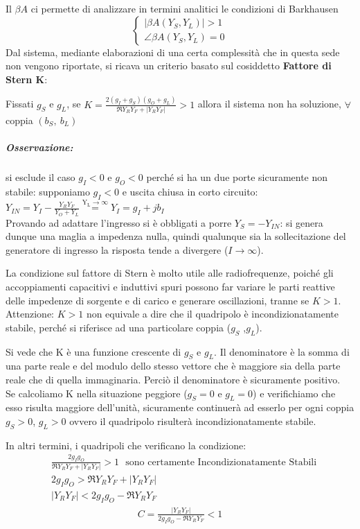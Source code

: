 Il $\beta A$ ci permette di analizzare in termini analitici le condizioni di Barkhausen
$$\begin{cases}
| \beta A (Y_S,Y_L) | > 1\\
\angle \beta A (Y_S,Y_L)  = 0
\end{cases}$$
Dal sistema, mediante elaborazioni di una certa complessità che in questa sede non vengono
riportate, si ricava un criterio basato sul cosiddetto \textbf{Fattore di Stern K}:

Fissati $g_S$ e $g_L$, se
$\displaystyle K = \frac{2(g_I+g_S)(g_O + g_L)}{\Re{Y_R Y_F}	+  |Y_R Y_F|} > 1$ allora il sistema non ha soluzione, $\forall$ coppia $(b_S,~b_L)$

\subparagraph{Osservazione:} si esclude il caso $g_I<0$ e $g_O<0$ perché si ha un due porte sicuramente non stabile:
supponiamo $g_I < 0$ e uscita chiusa in corto circuito: $Y_{IN} = Y_I - \frac{Y_R Y_F}{Y_O + Y_L} \overset{\mathrm{Y_L \rightarrow \infty}}{=} Y_I
= g_I + jb_I$
\\
Provando ad adattare l'ingresso si è obbligati a porre $Y_S = -Y_{IN}$: si genera dunque una maglia a impedenza nulla, quindi qualunque sia la sollecitazione del generatore di ingresso la risposta tende a divergere ($I \rightarrow \infty$).

La condizione sul fattore di Stern è molto utile alle radiofrequenze, poiché gli accoppiamenti capacitivi e induttivi spuri possono far variare le parti reattive delle impedenze di sorgente e di carico e generare oscillazioni, tranne se $K>1$.\\
Attenzione: $K>1$ non equivale a dire che il quadripolo è incondizionatamente stabile, perché si riferisce ad una particolare coppia ($g_S$ ,$g_L$).

Si vede che K è una funzione crescente di $g_S$ e $g_L$. Il denominatore è la somma di una parte reale e del modulo
dello stesso vettore che è maggiore sia della parte reale che di quella immaginaria. Perciò il
denominatore è sicuramente positivo.\\
Se calcoliamo K nella situazione peggiore ($g_S =0$ e $g_L =0$) e verifichiamo che esso risulta maggiore dell'unità, sicuramente continuerà ad esserlo per ogni coppia $g_S >0$, $g_L > 0$	ovvero il quadripolo risulterà incondizionatamente stabile.
	
In altri termini, i quadripoli che verificano la condizione:
\begin{align*}
&
\frac{2 g_I g_O}{\Re{Y_R Y_F} + |Y_R Y_F|} > 1
~~~
\mbox{sono certamente Incondizionatamente Stabili}\\
&
2 g_I g_O > \Re{Y_R Y_F} + |Y_R Y_F|
\\
&
|Y_R Y_F| < 2 g_I g_O - \Re{Y_R Y_F}
\end{align*}
\begin{align}
C = \frac{|Y_R Y_F|}{2 g_I g_O - \Re{Y_R Y_F}} < 1
\end{align}

